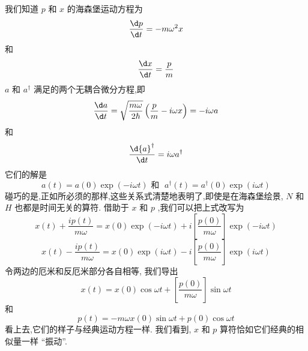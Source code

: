 我们知道 $p$ 和 $x$ 的海森堡运动方程为
\begin{equation}
\frac{\d p}{\d t} = - m{\omega }^{2}x
\end{equation}
和
\begin{equation}
\frac{\d x}{\d t} = \frac{p}{m}
\end{equation}
 $a$ 和 ${a}^{ \dagger }$ 满足的两个无耦合微分方程,即
\begin{equation}
\frac{\d a}{\d t} = \sqrt{\frac{m\omega }{2\hbar }}\left( {\frac{p}{m} - {i\omega x}}\right) = - {i\omega a}
\end{equation}
和
\begin{equation}
\frac{\d{a}^{ \dagger }}{\d t} = {i\omega }{a}^{ \dagger }
\end{equation}
它们的解是
\begin{equation}
a\left( t\right) = a\left( 0\right) \exp \left( {-{i\omega t}}\right) \text{ 和 }\;{a}^{ \dagger }\left( t\right) = {a}^{ \dagger }\left( 0\right) \exp \left( {i\omega t}\right)
\end{equation}
碰巧的是,正如所必须的那样,这些关系式清楚地表明了,即使是在海森堡绘景, $N$ 和 $H$ 也都是时间无关的算符. 借助于 $x$ 和 $p$ ,我们可以把上式改写为
\begin{equation}
x\left( t\right) + \frac{{ip}\left( t\right) }{m\omega } = x\left( 0\right) \exp \left( {-{i\omega t}}\right) + i\left\lbrack \frac{p\left( 0\right) }{m\omega }\right\rbrack \exp \left( {-{i\omega t}}\right)
\end{equation}
\begin{equation}
x\left( t\right) - \frac{{ip}\left( t\right) }{m\omega } = x\left( 0\right) \exp \left( {i\omega t}\right) - i\left\lbrack \frac{p\left( 0\right) }{m\omega }\right\rbrack \exp \left( {i\omega t}\right)
\end{equation}
令两边的厄米和反厄米部分各自相等, 我们导出
\begin{equation}
x\left( t\right) = x\left( 0\right) \cos {\omega t} + \left\lbrack \frac{p\left( 0\right) }{m\omega }\right\rbrack \sin {\omega t}
\end{equation}
和
\begin{equation}
p\left( t\right) = - {m\omega x}\left( 0\right) \sin {\omega t} + p\left( 0\right) \cos {\omega t}
\end{equation}
看上去,它们的样子与经典运动方程一样. 我们看到, $x$ 和 $p$ 算符恰如它们经典的相似量一样 “振动”.

